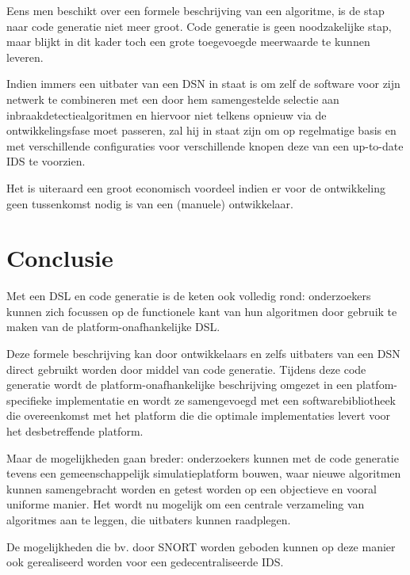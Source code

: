 Eens men beschikt over een formele beschrijving van een algoritme, is de stap
naar code generatie niet meer groot. Code generatie is geen noodzakelijke stap,
maar blijkt in dit kader toch een grote toegevoegde meerwaarde te kunnen
leveren.

Indien immers een uitbater van een DSN in staat is om zelf de software voor
zijn netwerk te combineren met een door hem samengestelde selectie aan
inbraakdetectiealgoritmen en hiervoor niet telkens opnieuw via de
ontwikkelingsfase moet passeren, zal hij in staat zijn om op regelmatige basis
en met verschillende configuraties voor verschillende knopen deze van een
up-to-date IDS te voorzien.

Het is uiteraard een groot economisch voordeel indien er voor de ontwikkeling
geen tussenkomst nodig is van een (manuele) ontwikkelaar.

\section{Conclusie}
\label{section:solution-conclusion}

Met een DSL en code generatie is de keten ook volledig rond: onderzoekers
kunnen zich focussen op de functionele kant van hun algoritmen door gebruik te
maken van de platform-onafhankelijke DSL.

Deze formele beschrijving kan door ontwikkelaars en zelfs uitbaters van een DSN
direct gebruikt worden door middel van code generatie. Tijdens deze code
generatie wordt de platform-onafhankelijke beschrijving omgezet in een
platfom-specifieke implementatie en wordt ze samengevoegd met een
softwarebibliotheek die overeenkomst met het platform die die optimale
implementaties levert voor het desbetreffende platform.

Maar de mogelijkheden gaan breder: onderzoekers kunnen met de code generatie
tevens een gemeenschappelijk simulatieplatform bouwen, waar nieuwe algoritmen
kunnen samengebracht worden en getest worden op een objectieve en vooral
uniforme manier. Het wordt nu mogelijk om een centrale verzameling van
algoritmes aan te leggen, die uitbaters kunnen raadplegen.

De mogelijkheden die bv. door SNORT worden geboden kunnen op deze manier ook
gerealiseerd worden voor een gedecentraliseerde IDS.
